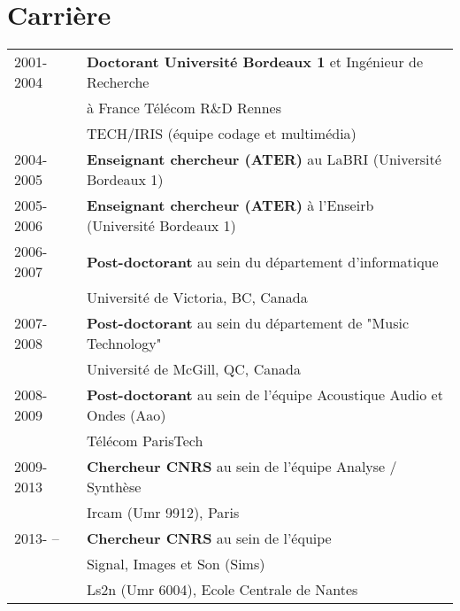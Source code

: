 \section{Carrière}
\begin{tabular}{ll}
  2001-2004 & {\bf Doctorant Université Bordeaux 1} et Ingénieur de Recherche \\
  &  à France Télécom R\&D Rennes \\
  & TECH/IRIS (équipe codage et multimédia) \\
  2004-2005 & {\bf Enseignant chercheur (ATER)} au LaBRI (Université Bordeaux 1) \\
  2005-2006 & {\bf Enseignant chercheur (ATER)}  à l'Enseirb (Université Bordeaux 1) \\
  2006-2007 & {\bf Post-doctorant} au sein du département d'informatique \\
  &  Université de Victoria, BC, Canada \\
 2007-2008 &  {\bf Post-doctorant} au sein du département de  "Music Technology"  \\
  &  Université de McGill, QC, Canada \\
 2008- 2009 &  {\bf Post-doctorant} au sein de  l'équipe  Acoustique Audio et Ondes (Aao)  \\
  & Télécom ParisTech \\
 2009-2013 &  {\bf Chercheur CNRS} au sein de l'équipe Analyse / Synthèse  \\
  & Ircam (Umr 9912), Paris \\
 2013- -- &  {\bf Chercheur CNRS} au sein de l'équipe \\
 & Signal, Images et Son (Sims)  \\
  & Ls2n (Umr 6004), Ecole Centrale de Nantes \\

\end{tabular}

